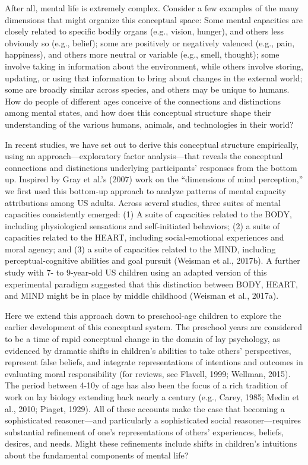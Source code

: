 \documentclass[10pt, letterpaper]{article}
\begin{document}
After all, mental life is extremely complex. Consider a few examples of
the many dimensions that might organize this conceptual space: Some
mental capacities are closely related to specific bodily organs (e.g.,
vision, hunger), and others less obviously so (e.g., belief); some are
positively or negatively valenced (e.g., pain, happiness), and others
more neutral or variable (e.g., smell, thought); some involve taking in
information about the environment, while others involve storing,
updating, or using that information to bring about changes in the
external world; some are broadly similar across species, and others may
be unique to humans. How do people of different ages conceive of the
connections and distinctions among mental states, and how does this
conceptual structure shape their understanding of the various humans,
animals, and technologies in their world?

In recent studies, we have set out to derive this conceptual structure
empirically, using an approach---exploratory factor analysis---that
reveals the conceptual connections and distinctions underlying
participants' responses from the bottom up. Inspired by Gray et al.'s
(2007) work on the ``dimensions of mind perception,'' we first used this
bottom-up approach to analyze patterns of mental capacity attributions
among US adults. Across several studies, three suites of mental
capacities consistently emerged: (1) A suite of capacities related to
the BODY, including physiological sensations and self-initiated
behaviors; (2) a suite of capacities related to the HEART, including
social-emotional experiences and moral agency; and (3) a suite of
capacities related to the MIND, including perceptual-cognitive abilities
and goal pursuit (Weisman et al., 2017b). A further study with 7- to
9-year-old US children using an adapted version of this experimental
paradigm suggested that this distinction between BODY, HEART, and MIND
might be in place by middle childhood (Weisman et al., 2017a).

Here we extend this approach down to preschool-age children to explore
the earlier development of this conceptual system. The preschool years
are considered to be a time of rapid conceptual change in the domain of
lay psychology, as evidenced by dramatic shifts in children's abilities
to take others' perspectives, represent false beliefs, and integrate
representations of intentions and outcomes in evaluating moral
responsibility (for reviews, see Flavell, 1999; Wellman, 2015). The
period between 4-10y of age has also been the focus of a rich tradition
of work on lay biology extending back nearly a century (e.g., Carey,
1985; Medin et al., 2010; Piaget, 1929). All of these accounts make the
case that becoming a sophisticated reasoner---and particularly a
sophisticated social reasoner---requires substantial refinement of one's
representations of others' experiences, beliefs, desires, and needs.
Might these refinements include shifts in children's intuitions about
the fundamental components of mental life?
\end{document}
